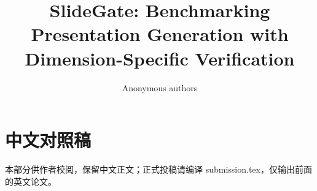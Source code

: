 \documentclass{article}
\title{SlideGate: Benchmarking \\ Presentation Generation with \\ Dimension-Specific Verification}
\author{Anonymous authors}
\begin{document}
\maketitle
\begin{abstract}

\end{abstract}






\label{maintextend}
\clearpage



\clearpage
\appendix

\ifdefined\EnglishOnly
\else
\clearpage
{}
{}
\section*{中文对照稿}
\noindent 本部分供作者校阅，保留中文正文；正式投稿请编译 submission.tex，仅输出前面的英文论文。
\setcounter{section}{0}
\setcounter{subsection}{0}
\setcounter{table}{0}
\setcounter{figure}{0}
\renewcommand{\thesection}{\arabic{section}}
\renewcommand{\theHsection}{zh.\arabic{section}}
\renewcommand{\theHtable}{zh.\arabic{table}}
\renewcommand{\theHfigure}{zh.\arabic{figure}}
\renewcommand{\tablename}{表}

\fi
\end{document}
